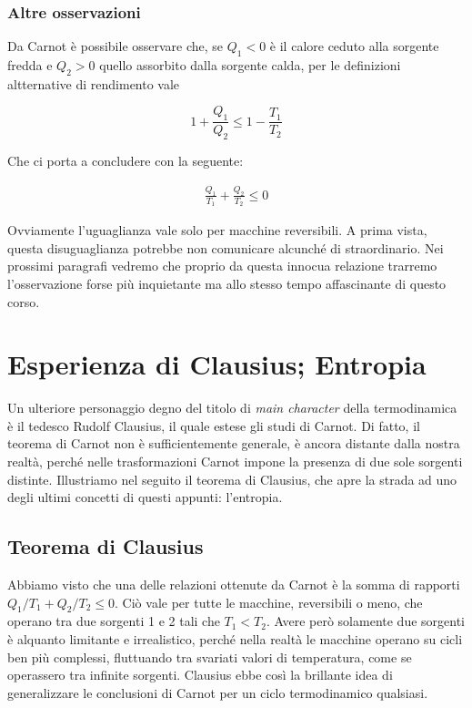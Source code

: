 \subsubsection*{Altre osservazioni}
Da Carnot è possibile osservare che, se $Q_1 < 0$ è il calore ceduto
alla sorgente fredda e $Q_2 > 0$ quello assorbito dalla sorgente
calda, per le definizioni altternative di rendimento vale

\[ 1 + \frac{Q_1}{Q_2} \leq 1 - \frac{T_1}{T_2} \]

\noindent Che ci porta a concludere con la seguente:

\begin{align}
    \frac{Q_1}{T_1} + \frac{Q_2}{T_2} \leq 0
\end{align}

Ovviamente l'uguaglianza vale solo per macchine reversibili.
A prima vista, questa disuguaglianza potrebbe non comunicare
alcunché di straordinario. Nei prossimi paragrafi vedremo che
proprio da questa innocua relazione trarremo l'osservazione
forse più inquietante ma allo stesso tempo affascinante di
questo corso.

\section{Esperienza di Clausius; Entropia}
Un ulteriore personaggio degno del titolo di \textit{main character}
della termodinamica è il tedesco Rudolf Clausius, il quale estese
gli studi di Carnot. Di fatto, il teorema di Carnot non è sufficientemente
generale, è ancora distante dalla nostra realtà, perché nelle trasformazioni
Carnot impone la presenza di due sole sorgenti distinte. Illustriamo nel seguito
il teorema di Clausius, che apre la strada ad uno degli ultimi concetti di questi
appunti: l'entropia.

\subsection{Teorema di Clausius}
Abbiamo visto che una delle relazioni ottenute da Carnot è la
somma di rapporti $Q_1/T_1 + Q_2/T_2 \leq 0$. Ciò vale per tutte
le macchine, reversibili o meno, che operano tra due sorgenti 1
e 2 tali che $T_1 < T_2$. Avere però solamente due sorgenti è
alquanto limitante e irrealistico, perché nella realtà le macchine
operano su cicli ben più complessi, fluttuando tra svariati valori
di temperatura, come se operassero tra infinite sorgenti. Clausius
ebbe così la brillante idea di generalizzare le conclusioni di
Carnot per un ciclo termodinamico qualsiasi.

